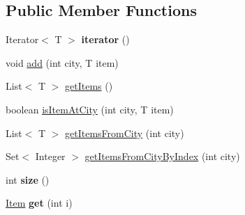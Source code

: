 \subsection*{Public Member Functions}
\begin{DoxyCompactItemize}
\item 
\hypertarget{classcom_1_1msu_1_1thief_1_1model_1_1ItemCollection_3_01T_01extends_01Item_01_4_a81bcb2492a8fc8324338fc9c93d243b4}{Iterator$<$ T $>$ {\bfseries iterator} ()}\label{classcom_1_1msu_1_1thief_1_1model_1_1ItemCollection_3_01T_01extends_01Item_01_4_a81bcb2492a8fc8324338fc9c93d243b4}

\item 
void \hyperlink{classcom_1_1msu_1_1thief_1_1model_1_1ItemCollection_3_01T_01extends_01Item_01_4_a11bea9852ef956861f92527831083aac}{add} (int city, T item)
\item 
List$<$ T $>$ \hyperlink{classcom_1_1msu_1_1thief_1_1model_1_1ItemCollection_3_01T_01extends_01Item_01_4_a8ba2465ea966528d155028525f417702}{get\-Items} ()
\item 
boolean \hyperlink{classcom_1_1msu_1_1thief_1_1model_1_1ItemCollection_3_01T_01extends_01Item_01_4_a82d96f8e83739b321cc185119481f770}{is\-Item\-At\-City} (int city, T item)
\item 
List$<$ T $>$ \hyperlink{classcom_1_1msu_1_1thief_1_1model_1_1ItemCollection_3_01T_01extends_01Item_01_4_a3d2560312732695c625bc083bc440761}{get\-Items\-From\-City} (int city)
\item 
Set$<$ Integer $>$ \hyperlink{classcom_1_1msu_1_1thief_1_1model_1_1ItemCollection_3_01T_01extends_01Item_01_4_a87765ea1b66b6a31d89679c9ca768413}{get\-Items\-From\-City\-By\-Index} (int city)
\item 
\hypertarget{classcom_1_1msu_1_1thief_1_1model_1_1ItemCollection_3_01T_01extends_01Item_01_4_a61467644747e6a702b72abad14bb12ac}{int {\bfseries size} ()}\label{classcom_1_1msu_1_1thief_1_1model_1_1ItemCollection_3_01T_01extends_01Item_01_4_a61467644747e6a702b72abad14bb12ac}

\item 
\hypertarget{classcom_1_1msu_1_1thief_1_1model_1_1ItemCollection_3_01T_01extends_01Item_01_4_aee431beb012ef3de53ade3cdf59a4131}{\hyperlink{classcom_1_1msu_1_1thief_1_1model_1_1Item}{Item} {\bfseries get} (int i)}\label{classcom_1_1msu_1_1thief_1_1model_1_1ItemCollection_3_01T_01extends_01Item_01_4_aee431beb012ef3de53ade3cdf59a4131}

\end{DoxyCompactItemize}
